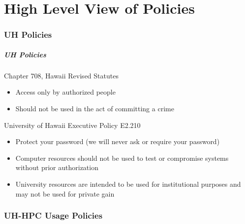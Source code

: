 \part{High Level View of Policies}
\begin{frame}
			 \partpage
\end{frame}



\section[UH Policies]{UH Policies}
\begin{frame}
  \frametitle{UH Policies}
	\begin{block}{Chapter 708, Hawaii Revised Statutes}
	\begin{itemize}
	\item Access only by authorized people
	\item Should not be used in the act of committing a crime
	\end{itemize}
	\end{block}
	\begin{block}{University of Hawaii Executive Policy E2.210} 
	\begin{itemize}
	\item Protect your password (we will never ask or require your password)
	\item Computer resources should not be used to test or compromise systems without prior authorization
	\item University resources are intended to be used for institutional purposes and may not be used for private gain
	\end{itemize}
	\end{block}
\end{frame}

\section[UH-HPC Usage Policies]{UH-HPC Usage Policies}

